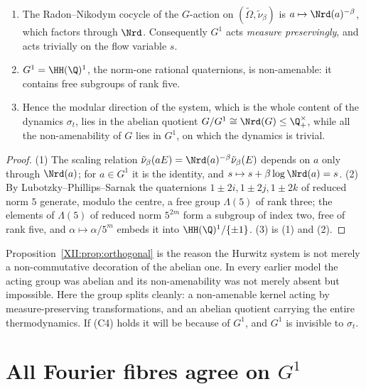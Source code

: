 \begin{proposition}\label{XII:prop:orthogonal}
\begin{enumerate}
\item The Radon--Nikodym cocycle of the $G$-action on $(\widetilde\Omega,\tilde\nu_\beta)$ is
$a\mapsto\Nrd(a)^{-\beta}$, which factors through $\Nrd$. Consequently $G^1$ acts
\emph{measure preservingly}, and acts trivially on the flow variable $s$.
\item $G^1=\HH(\Q)^1$, the norm-one rational quaternions, is non-amenable: it contains
free subgroups of rank five.
\item Hence the modular direction of the system, which is the whole content of the dynamics
$\sigma_t$, lies in the abelian quotient $G/G^1\cong\Nrd(G)\le\Q^\times_+$, while all the
non-amenability of $G$ lies in $G^1$, on which the dynamics is trivial.
\end{enumerate}
\end{proposition}

\begin{proof}
(1) The scaling relation $\tilde\nu_\beta(aE)=\Nrd(a)^{-\beta}\tilde\nu_\beta(E)$ depends on
$a$ only through $\Nrd(a)$; for $a\in G^1$ it is the identity, and
$s\mapsto s+\beta\log\Nrd(a)=s$. (2) By Lubotzky--Phillips--Sarnak \cite[\S3]{LPS} the
quaternions $1\pm2i,1\pm2j,1\pm2k$ of reduced norm $5$ generate, modulo the centre, a free
group $\Lambda(5)$ of rank three; the elements of $\Lambda(5)$ of reduced norm $5^{2m}$ form
a subgroup of index two, free of rank five, and $\alpha\mapsto\alpha/5^m$ embeds it into
$\HH(\Q)^1/\{\pm1\}$. (3) is (1) and (2).
\end{proof}

\begin{remark}\label{XII:rem:changes}
Proposition~\ref{XII:prop:orthogonal} is the reason the Hurwitz system is not merely a
non-commutative decoration of the abelian one. In every earlier model the acting group was
abelian and its non-amenability was not merely absent but impossible. Here the group splits
cleanly: a non-amenable kernel acting by measure-preserving transformations, and an abelian
quotient carrying the entire thermodynamics. If (C4) holds it will be because of $G^1$, and
$G^1$ is invisible to $\sigma_t$.
\end{remark}

\section{All Fourier fibres agree on $G^1$}

